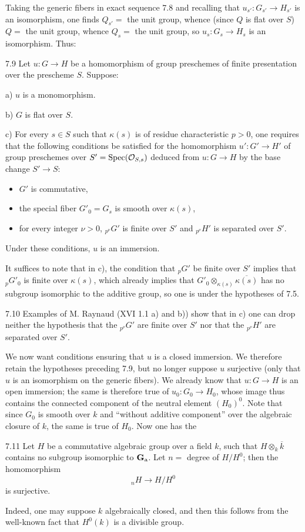 Taking the generic fibers in exact sequence 7.8 and recalling that $u_{s'}:G_{s'}\to H_{s'}$ is an isomorphism, one finds $Q_{s'}=$ the unit group, whence (since $Q$ is flat over $S$) $Q=$ the unit group, whence $Q_s=$ the unit group, so $u_s:G_s\to H_s$ is an isomorphism. Thus:
\begin{proposition}{7.9}\label{VIII.7.9}
Let $u:G\to H$ be a homomorphism of group preschemes of finite presentation over the prescheme $S$. Suppose:

a) $u$ is a monomorphism.

b) $G$ is flat over $S$.

c) For every $s\in S$ such that $\kappa(s)$ is of residue characteristic $p>0$, one requires that the following conditions be satisfied for the homomorphism $u':G'\to H'$ of group preschemes over $S'=\operatorname{Spec}(\mathcal{O}_{S,s})$ deduced from $u:G\to H$ by the base change $S'\to S$:
\begin{itemize}
\item $G'$ is commutative,
\item the special fiber $G'_0=G_s$ is smooth over $\kappa(s)$,
\item for every integer $\nu>0$, ${}_{p^\nu}G'$ is finite over $S'$ and ${}_{p^\nu}H'$ is separated over $S'$.
\end{itemize}
Under these conditions, $u$ is an immersion.
\end{proposition}
It suffices to note that in c), the condition that ${}_pG'$ be finite over $S'$ implies that ${}_pG'_0$ is finite over $\kappa(s)$, which already implies that $G'_0\otimes_{\kappa(s)}\overline{\kappa(s)}$ has no subgroup isomorphic to the additive group, so one is under the hypotheses of 7.5.
\begin{remark}{7.10}\label{VIII.7.10}
Examples of M. Raynaud (XVI 1.1 a) and b)) show that in c) one can drop neither the hypothesis that the ${}_{p^\nu}G'$ are finite over $S'$ nor that the ${}_{p^\nu}H'$ are separated over $S'$.
\end{remark}
We now want conditions ensuring that $u$ is a closed immersion. We therefore retain the hypotheses preceding 7.9, but no longer suppose $u$ surjective (only that $u$ is an isomorphism on the generic fibers). We already know that $u:G\to H$ is an open immersion; the same is therefore true of $u_0:G_0\to H_0$, whose image thus contains the connected component of the neutral element $(H_0)^0$. Note that since $G_0$ is smooth over $k$ and ``without additive component'' over the algebraic closure of $k$, the same is true of $H_0$. Now one has the
\begin{lemma}{7.11}\label{VIII.7.11}
Let $H$ be a commutative algebraic group over a field $k$, such that $H\otimes_k\overline k$ contains no subgroup isomorphic to $\mathbf{G}_{\mathrm{a}}$. Let $n=$ degree of $H/H^0$; then the homomorphism
\[
{}_nH\to H/H^0
\]
is surjective.
\end{lemma}
Indeed, one may suppose $k$ algebraically closed, and then this follows from the well-known fact that $H^0(k)$ is a divisible group.

